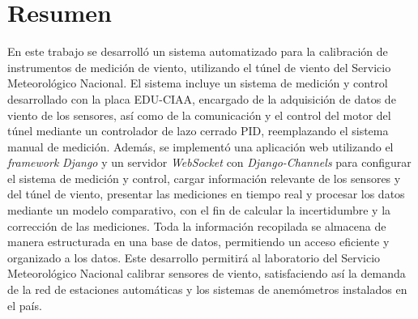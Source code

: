 \chapter*{Resumen}
En este trabajo se desarrolló un sistema automatizado para la calibración de instrumentos de medición de viento, utilizando el túnel de viento del Servicio Meteorológico Nacional. El sistema incluye un sistema de medición y control desarrollado con la placa EDU-CIAA, encargado de la adquisición de datos de viento de los sensores, así como de la comunicación y el control del motor del túnel mediante un controlador de lazo cerrado PID, reemplazando el sistema manual de medición. Además, se implementó una aplicación web utilizando el \textit{framework} \textit{Django} y un servidor \textit{WebSocket} con \textit{Django-Channels} para configurar el sistema de medición y control, cargar información relevante de los sensores y del túnel de viento, presentar las mediciones en tiempo real y procesar los datos mediante un modelo comparativo, con el fin de calcular la incertidumbre y la corrección de las mediciones. Toda la información recopilada se almacena de manera estructurada en una base de datos, permitiendo un acceso eficiente y organizado a los datos. Este desarrollo permitirá al laboratorio del Servicio Meteorológico Nacional calibrar sensores de viento, satisfaciendo así la demanda de la red de estaciones automáticas y los sistemas de anemómetros instalados en el país.

